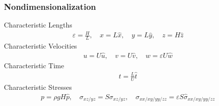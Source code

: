 \documentclass[10pt]{beamer}
\begin{document}
      \begin{frame}
        \frametitle{Nondimensionalization}
        Characteristic Lengths
        \begin{gather*}
          \varepsilon = \frac{H}{L}, \quad x = L\hat{x}, \quad y = L\hat{y}, \quad z = H\hat{z}
        \end{gather*}
        Characteristic Velocities
        \begin{gather*}
          u = U\hat{u}, \quad v = U\hat{v}, \quad w = \varepsilon U \hat{w}
        \end{gather*}
        Characteristic Time
        \begin{gather*}
          t = \frac{L}{U}\hat{t}
        \end{gather*}
        Characteristic Stresses
        \begin{gather*}
          p = \rho g H \hat{p}, \quad \sigma_{xz/yz} = S\hat{\sigma}_{xz/yz}, \quad
          \sigma_{xx/xy/yy/zz} = \varepsilon S \hat{\sigma}_{xx/xy/yy/zz}
        \end{gather*}
      \end{frame}
\end{document}
